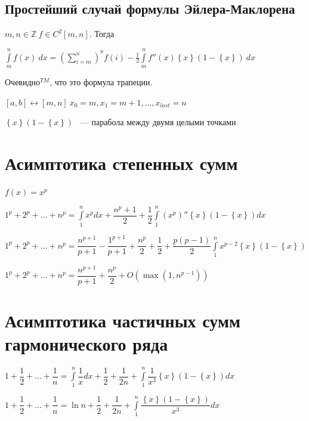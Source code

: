 \documentclass{article}
\begin{document}
		\subsection{Простейший случай формулы Эйлера-Маклорена}

			$m, n \in \mathbb{Z} \ f \in C^2[m, n]$. Тогда

			$\int\limits^n_m f(x) \ dx = (\sum\limits^n_{i = m})^{\triangledown} f(i) - \frac{1}{2} \int\limits^n_m f''(x) \left\{ x \right\} (1 - \left\{ x \right\}) \ dx$

			Очевидно$^{TM}$, что это формула трапеции.

			$[a, b] \leftrightarrow [m, n] \ x_0 = m, x_1 = m + 1, \ldots, x_{last} = n$

			$\left\{ x \right\} (1 - \left\{ x \right\})$ ~--- парабола между двумя целыми точками
		
    \newpage
    
    \section{Асимптотика степенных сумм}
        
        $f(x) = x^p$
        
        $1^p + 2^p + \ldots + n^p = \int\limits^n_1 x^p dx + \dfrac{n^p + 1}{2} + \dfrac{1}{2} \int\limits^n_1 (x^p)'' \left\{ x \right\} (1 - \left\{ x \right\}) dx$
            
        $1^p + 2^p + \ldots + n^p = \dfrac{n^{p + 1}}{p + 1} - \dfrac{1^{p + 1}}{p + 1} + \dfrac{n^p}{2} + \dfrac{1}{2} + \dfrac{p(p - 1)}{2} \int\limits^n_1 x^{p - 2} \left\{ x \right\} (1 - \left\{ x \right\})$
            
        $1^p + 2^p + \ldots + n^p = \dfrac{n^{p + 1}}{p + 1} + \dfrac{n^p}{2} + O(\max(1, n^{p - 1}))$
    
    \newpage
    
    \section{Асимптотика частичных сумм гармонического ряда}
    
        $1 + \dfrac{1}{2} + \ldots + \dfrac{1}{n} = \int\limits^n_1 \dfrac{1}{x} dx + \dfrac{1}{2} + \dfrac{1}{2n} + \int\limits^n_1 \dfrac{1}{x^3} \left\{ x \right\}(1 - \left\{ x \right\}) dx$
        
        $1 + \dfrac{1}{2} + \ldots + \dfrac{1}{n} = \ln n + \dfrac{1}{2} + \dfrac{1}{2n} + \int\limits^n_1 \dfrac{\left\{ x \right\}(1 - \left\{ x \right\})}{x^3} dx$
        
\end{document}
